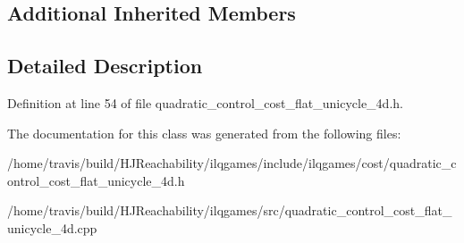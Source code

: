\subsection*{Additional Inherited Members}


\subsection{Detailed Description}


Definition at line 54 of file quadratic\+\_\+control\+\_\+cost\+\_\+flat\+\_\+unicycle\+\_\+4d.\+h.



The documentation for this class was generated from the following files\+:\begin{DoxyCompactItemize}
\item 
/home/travis/build/\+H\+J\+Reachability/ilqgames/include/ilqgames/cost/quadratic\+\_\+control\+\_\+cost\+\_\+flat\+\_\+unicycle\+\_\+4d.\+h\item 
/home/travis/build/\+H\+J\+Reachability/ilqgames/src/quadratic\+\_\+control\+\_\+cost\+\_\+flat\+\_\+unicycle\+\_\+4d.\+cpp\end{DoxyCompactItemize}
